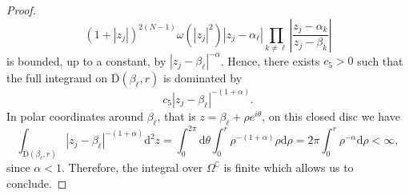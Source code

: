 \documentclass[pdflatex,sn-mathphys-num]{sn-jnl}
\theoremstyle{thmstyleone}
\numberwithin{equation}{section}
\begin{document}
\begin{proof}
    \begin{equation*}
        (1+\left|z_{j}\right|)^{2(N-1)}\omega(\left|z_{j}\right|^{2})\left|z_{j}-\alpha_{\ell}\right|\prod\limits_{k\neq\ell}^{}\left|\frac{z_{j}-\alpha_{k}}{z_{j}-\beta_{k}}\right|
    \end{equation*}
    is bounded, up to a constant, by $\left|z_{j}-\beta_{\ell}\right|^{-\alpha}$. Hence, there exists $c_{5}>0$ such that the full integrand on $\overline{\mathrm{D}}(\beta_{\ell},r)$ is dominated by
    \begin{equation*}
        c_{5}\left|z_{j}-\beta_{\ell}\right|^{-(1+\alpha)}.
    \end{equation*}
    In polar coordinates around $\beta_{\ell}$, that is $z=\beta_{\ell}+\rho e^{i\theta}$, on this closed disc we have
    \begin{equation*}
        \int_{\overline{\mathrm{D}}(\beta_{\ell},r)}\left|z_{j}-\beta_{\ell}\right|^{-(1+\alpha)}\mathrm{d}^{2}z=\int_{0}^{2\pi}\mathrm{d}\theta\int_{0}^{r}\rho^{-(1+\alpha)}\rho\mathrm{d}\rho=2\pi\int_{0}^{r}\rho^{-\alpha}\mathrm{d}\rho <\infty,
    \end{equation*}
    since $\alpha<1$. Therefore, the integral over $\Omega^{\complement}$ is finite which allows us to conclude.
    
\end{proof}
\end{document}
